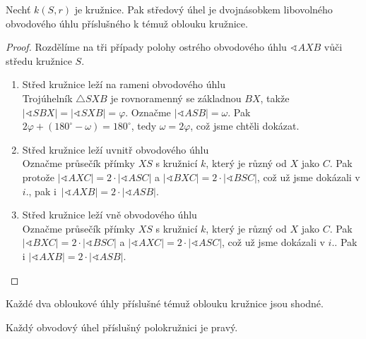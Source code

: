 \begin{veta}
  Nechť $k(S,r)$ je kružnice. Pak středový úhel je dvojnásobkem libovolného obvodového úhlu příslušného k témuž oblouku kružnice.
\end{veta}

\begin{proof}
  Rozdělíme na tři případy polohy ostrého obvodového úhlu $\sphericalangle AXB$ vůči středu kružnice $S$.
  \begin{enumerate}[$i.$]
    \item Střed kružnice leží na rameni obvodového úhlu\\
    Trojúhelník $\triangle SXB$ je rovnoramenný se základnou $BX$, takže $|\sphericalangle SBX| = |\sphericalangle SXB|=\varphi$. Označme $|\sphericalangle ASB|=\omega$. Pak $2\varphi + (180^\circ - \omega)=180^\circ$, tedy $\omega = 2\varphi$, což jsme chtěli dokázat.
    \item Střed kružnice leží uvnitř obvodového úhlu\\
    Označme průsečík přímky $XS$ s kružnicí $k$, který je různý od $X$ jako $C$. Pak protože $|\sphericalangle AXC|=2\cdot|\sphericalangle ASC|$ a
    $|\sphericalangle BXC|=2\cdot|\sphericalangle BSC|$, což už jsme dokázali v $i.$, pak i~$|\sphericalangle AXB| = 2\cdot|\sphericalangle ASB|$.
    \item Střed kružnice leží vně obvodového úhlu\\
    Označme průsečík přímky $XS$ s kružnicí $k$, který je různý od $X$ jako $C$. Pak $|\sphericalangle BXC| = 2\cdot|\sphericalangle BSC|$ a $|\sphericalangle AXC|=2\cdot|\sphericalangle ASC|$, což už jsme dokázali v $i.$. Pak i $|\sphericalangle AXB| = 2\cdot|\sphericalangle ASB|$.\qedhere
  \end{enumerate}
\end{proof}

\begin{veta}
  Každé dva obloukové úhly příslušné témuž oblouku kružnice jsou shodné.
\end{veta}

\begin{veta}[Thaletova]
  Každý obvodový úhel příslušný polokružnici je pravý.
\end{veta}


